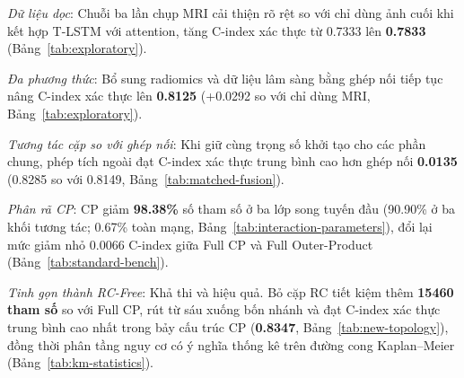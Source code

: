 \begin{description}[leftmargin=1.35cm,labelwidth=1.1cm,itemsep=.3em]
\item[RQ1.] \emph{Dữ liệu dọc}: Chuỗi ba lần chụp MRI cải thiện rõ rệt so với chỉ dùng ảnh cuối khi kết hợp T-LSTM với attention, tăng C-index xác thực từ 0.7333 lên \textbf{0.7833} (Bảng~\ref{tab:exploratory}).
\item[RQ2.] \emph{Đa phương thức}: Bổ sung radiomics và dữ liệu lâm sàng bằng ghép nối tiếp tục nâng C-index xác thực lên \textbf{0.8125} (+0.0292 so với chỉ dùng MRI, Bảng~\ref{tab:exploratory}).
\item[RQ3.] \emph{Tương tác cặp so với ghép nối}: Khi giữ cùng trọng số khởi tạo cho các phần chung, phép tích ngoài đạt C-index xác thực trung bình cao hơn ghép nối \textbf{0.0135} (0.8285 so với 0.8149, Bảng~\ref{tab:matched-fusion}).
\item[RQ4.] \emph{Phân rã CP}: CP giảm \textbf{98.38\%} số tham số ở ba lớp song tuyến đầu (90.90\% ở ba khối tương tác; 0.67\% toàn mạng, Bảng~\ref{tab:interaction-parameters}), đổi lại mức giảm nhỏ 0.0066 C-index giữa Full CP và Full Outer-Product (Bảng~\ref{tab:standard-bench}).
\item[RQ5.] \emph{Tinh gọn thành RC-Free}: Khả thi và hiệu quả. Bỏ cặp RC tiết kiệm thêm \textbf{15460 tham số} so với Full CP, rút từ sáu xuống bốn nhánh và đạt C-index xác thực trung bình cao nhất trong bảy cấu trúc CP (\textbf{0.8347}, Bảng~\ref{tab:new-topology}), đồng thời phân tầng nguy cơ có ý nghĩa thống kê trên đường cong Kaplan--Meier (Bảng~\ref{tab:km-statistics}).
\end{description}
